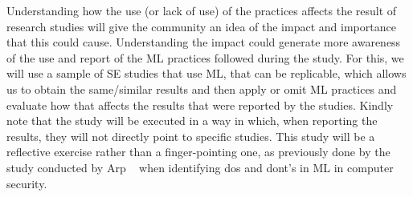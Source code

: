 Understanding how the use (or lack of use) of the practices  affects the result of research studies will give the community an idea of the impact and importance that this could cause.  Understanding the impact could generate more awareness of the use and report of the ML practices followed during the study.  For this, we will use a sample of  SE studies that use ML, that can be replicable, which allows us to obtain the same/similar results and then apply or omit ML practices and evaluate how that affects the results that were reported by the studies.  Kindly note that the study will be executed in a way in which, when reporting the results, they will not directly point to specific studies. This study will be a reflective exercise rather than a finger-pointing one, as previously done by the study conducted by Arp \etal~\cite{ArpQuiPen_22} when identifying dos and dont's in ML in computer security.

\iffalse
four papers
1) Paper that was submitted and is being reviewed (describe what we have done)
2) Paper from the research perspective ( if at some point can be done)  - Paper with David and Dennys (describe what we have done)

DESCRIBE ALSO CAIN 

3) Handbook of practices
4) What if we apply them to previous research?

\fi